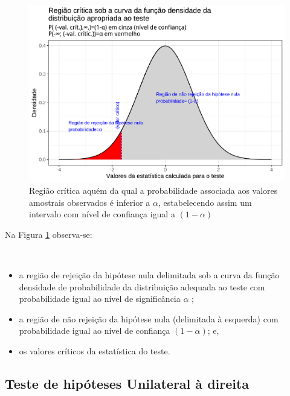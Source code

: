 \documentclass[
]{book}
\providecommand{\tightlist}{%
  \setlength{\itemsep}{0pt}\setlength{\parskip}{0pt}}
\begin{document}
\begin{figure}

{\centering \includegraphics[width=1\linewidth]{apostila_files/figure-latex/fig71-1} 

}

\caption{Região crítica aquém da qual a probabilidade associada aos valores amostrais observados é inferior a $\alpha$, estabelecendo assim um intervalo com nível de confiança igual a $(1-\alpha)$}\label{fig:fig71}
\end{figure}

\hfill\break

Na Figura \ref{fig:fig71} observa-se:

~

\begin{itemize}
\tightlist
\item
  a região de rejeição da hipótese nula delimitada sob a curva da função densidade de probabilidade da distribuição adequada ao teste com probabilidade igual ao nível de significância \(\alpha\) ;\\
\item
  a região de não rejeição da hipótese nula (delimitada à esquerda) com probabilidade igual ao nível de confiança \((1-\alpha)\); e,\\
\item
  os valores críticos da estatística do teste.
\end{itemize}

\hypertarget{teste-de-hipuxf3teses-unilateral-uxe0-direita}{%
\subsection{Teste de hipóteses Unilateral à direita}\label{teste-de-hipuxf3teses-unilateral-uxe0-direita}}
\end{document}

